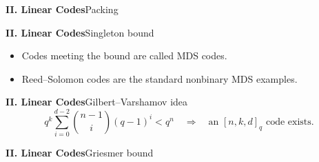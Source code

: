 \begin{frame}{\textbf{II. Linear Codes}}{Packing}
\small
{}
\end{frame}

\begin{frame}{\textbf{II. Linear Codes}}{Singleton bound}
\small
{}
\begin{itemize}
  \item Codes meeting the bound are called MDS codes.
  \item Reed--Solomon codes are the standard nonbinary MDS examples.
\end{itemize}
\end{frame}

\begin{frame}{\textbf{II. Linear Codes}}{Gilbert--Varshamov idea}
\small
{}
\[
  q^k\sum_{i=0}^{d-2}\binom{n-1}{i}(q-1)^i < q^n
  \quad\Rightarrow\quad
  \text{an }[n,k,d]_q\text{ code exists.}
\]
\end{frame}

\begin{frame}{\textbf{II. Linear Codes}}{Griesmer bound}
\small
{}
\end{frame}

